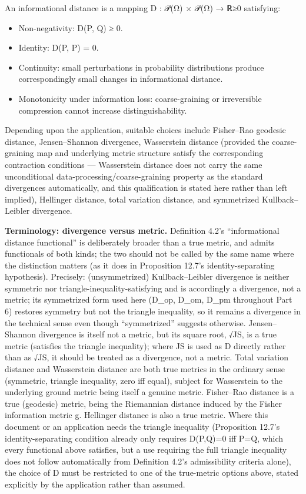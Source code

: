 \documentclass[
]{article}
\begin{document}
An informational distance is a mapping D : 𝒫(Ω) × 𝒫(Ω) → ℝ≥0 satisfying:

\begin{itemize}
\item
  Non-negativity: D(P, Q) ≥ 0.
\item
  Identity: D(P, P) = 0.
\item
  Continuity: small perturbations in probability distributions produce
  correspondingly small changes in informational distance.
\item
  Monotonicity under information loss: coarse-graining or irreversible
  compression cannot increase distinguishability.
\end{itemize}

Depending upon the application, suitable choices include Fisher--Rao
geodesic distance, Jensen--Shannon divergence, Wasserstein distance
(provided the coarse-graining map and underlying metric structure
satisfy the corresponding contraction conditions --- Wasserstein
distance does not carry the same unconditional
data-processing/coarse-graining property as the standard divergences
automatically, and this qualification is stated here rather than left
implied), Hellinger distance, total variation distance, and symmetrized
Kullback--Leibler divergence.

\textbf{Terminology: divergence versus metric.} Definition 4.2's
``informational distance functional'' is deliberately broader than a
true metric, and admits functionals of both kinds; the two should not be
called by the same name where the distinction matters (as it does in
Proposition 12.7's identity-separating hypothesis). Precisely:
(unsymmetrized) Kullback--Leibler divergence is neither symmetric nor
triangle-inequality-satisfying and is accordingly a divergence, not a
metric; its symmetrized form used here (D\_op, D\_om, D\_pm throughout
Part 6) restores symmetry but not the triangle inequality, so it remains
a divergence in the technical sense even though ``symmetrized'' suggests
otherwise. Jensen--Shannon divergence is itself not a metric, but its
square root, √JS, is a true metric (satisfies the triangle inequality);
where JS is used as D directly rather than as √JS, it should be treated
as a divergence, not a metric. Total variation distance and Wasserstein
distance are both true metrics in the ordinary sense (symmetric,
triangle inequality, zero iff equal), subject for Wasserstein to the
underlying ground metric being itself a genuine metric. Fisher--Rao
distance is a true (geodesic) metric, being the Riemannian distance
induced by the Fisher information metric g. Hellinger distance is also a
true metric. Where this document or an application needs the triangle
inequality (Proposition 12.7's identity-separating condition already
only requires D(P,Q)=0 iff P=Q, which every functional above satisfies,
but a use requiring the full triangle inequality does not follow
automatically from Definition 4.2's admissibility criteria alone), the
choice of D must be restricted to one of the true-metric options above,
stated explicitly by the application rather than assumed.
\end{document}
